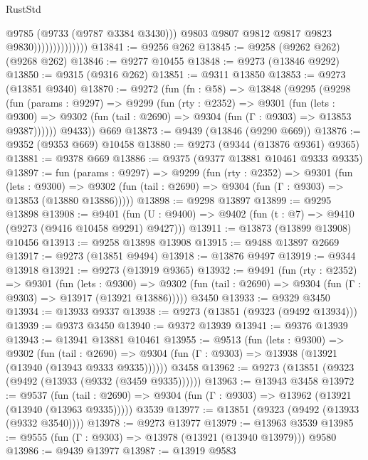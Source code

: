 \begin{lexlean}{RustStd}
\begin{coremodule}
                                  @9785
                                  (@9733 (@9787 @3384 @3430)))
                                @9803
                                @9807
                                @9812
                                @9817
                                @9823
                                @9830))))))))))))))
@13841 := @9256 @262
@13845 := @9258 (@9262 @262) (@9268 @262)
@13846 := @9277 @10455
@13848 := @9273 (@13846 @9292)
@13850 := @9315 (@9316 @262)
@13851 := @9311 @13850
@13853 := @9273 (@13851 @9340)
@13870 := @9272
    (fun (fn : @58) =>
    @13848
      (@9295
        (@9298
          (fun (params : @9297) =>
          @9299
            (fun (rty : @2352) =>
            @9301
              (fun (lets : @9300) =>
              @9302 (fun (tail : @2690) => @9304 (fun (Γ : @9303) => @13853 @9387))))))
        @9433))
    @669
@13873 := @9439 (@13846 (@9290 @669))
@13876 := @9352 (@9353 @669) @10458
@13880 := @9273 (@9344 (@13876 @9361) @9365)
@13881 := @9378 @669
@13886 := @9375 (@9377 @13881 @10461 @9333 @9335)
@13897 := fun (params : @9297) =>
  @9299
    (fun (rty : @2352) =>
    @9301
      (fun (lets : @9300) =>
      @9302 (fun (tail : @2690) => @9304 (fun (Γ : @9303) => @13853 (@13880 @13886)))))
@13898 := @9298 @13897
@13899 := @9295 @13898
@13908 := @9401
    (fun (U : @9400) => @9402 (fun (t : @7) => @9410 (@9273 (@9416 @10458 @9291) @9427)))
@13911 := @13873 (@13899 @13908) @10456
@13913 := @9258 @13898 @13908
@13915 := @9488 @13897 @2669
@13917 := @9273 (@13851 @9494)
@13918 := @13876 @9497
@13919 := @9344 @13918
@13921 := @9273 (@13919 @9365)
@13932 := @9491
    (fun (rty : @2352) =>
    @9301
      (fun (lets : @9300) =>
      @9302 (fun (tail : @2690) => @9304 (fun (Γ : @9303) => @13917 (@13921 @13886)))))
    @3450
@13933 := @9329 @3450
@13934 := @13933 @9337
@13938 := @9273 (@13851 (@9323 (@9492 @13934)))
@13939 := @9373 @3450
@13940 := @9372 @13939
@13941 := @9376 @13939
@13943 := @13941 @13881 @10461
@13955 := @9513
    (fun (lets : @9300) =>
    @9302
      (fun (tail : @2690) =>
      @9304 (fun (Γ : @9303) => @13938 (@13921 (@13940 (@13943 @9333 @9335))))))
    @3458
@13962 := @9273 (@13851 (@9323 (@9492 (@13933 (@9332 (@3459 @9335))))))
@13963 := @13943 @3458
@13972 := @9537
    (fun (tail : @2690) => @9304 (fun (Γ : @9303) => @13962 (@13921 (@13940 (@13963 @9335)))))
    @3539
@13977 := @13851 (@9323 (@9492 (@13933 (@9332 @3540))))
@13978 := @9273 @13977
@13979 := @13963 @3539
@13985 := @9555 (fun (Γ : @9303) => @13978 (@13921 (@13940 @13979))) @9580
@13986 := @9439 @13977
@13987 := @13919 @9583

\end{coremodule}
\end{lexlean}
